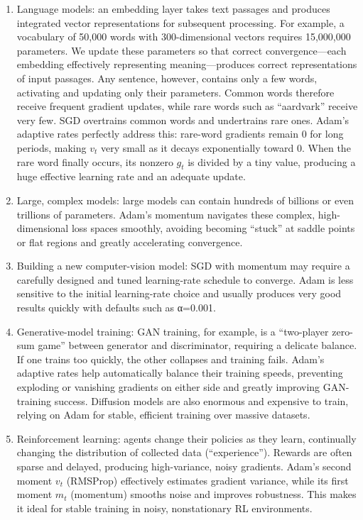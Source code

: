 \begin{enumerate}
\def\labelenumi{\arabic{enumi}.}
\item
  Language models: an embedding layer takes text passages and produces integrated vector representations for subsequent processing. For example, a vocabulary of 50,000 words with 300-dimensional vectors requires 15,000,000 parameters. We update these parameters so that correct convergence---each embedding effectively representing meaning---produces correct representations of input passages. Any sentence, however, contains only a few words, activating and updating only their parameters. Common words therefore receive frequent gradient updates, while rare words such as ``aardvark'' receive very few. SGD overtrains common words and undertrains rare ones. Adam's adaptive rates perfectly address this: rare-word gradients remain \(0\) for long periods, making \(v_t\) very small as it decays exponentially toward \(0\). When the rare word finally occurs, its nonzero \(g_t\) is divided by a tiny value, producing a huge effective learning rate and an adequate update.
\item
  Large, complex models: large models can contain hundreds of billions or even trillions of parameters. Adam's momentum navigates these complex, high-dimensional loss spaces smoothly, avoiding becoming ``stuck'' at saddle points or flat regions and greatly accelerating convergence.
\item
  Building a new computer-vision model: SGD with momentum may require a carefully designed and tuned learning-rate schedule to converge. Adam is less sensitive to the initial learning-rate choice and usually produces very good results quickly with defaults such as α=0.001.
\item
  Generative-model training: GAN training, for example, is a ``two-player zero-sum game'' between generator and discriminator, requiring a delicate balance. If one trains too quickly, the other collapses and training fails. Adam's adaptive rates help automatically balance their training speeds, preventing exploding or vanishing gradients on either side and greatly improving GAN-training success. Diffusion models are also enormous and expensive to train, relying on Adam for stable, efficient training over massive datasets.
\item
  Reinforcement learning: agents change their policies as they learn, continually changing the distribution of collected data (``experience''). Rewards are often sparse and delayed, producing high-variance, noisy gradients. Adam's second moment \(v_t\) (RMSProp) effectively estimates gradient variance, while its first moment \(m_t\) (momentum) smooths noise and improves robustness. This makes it ideal for stable training in noisy, nonstationary RL environments.
\end{enumerate}

